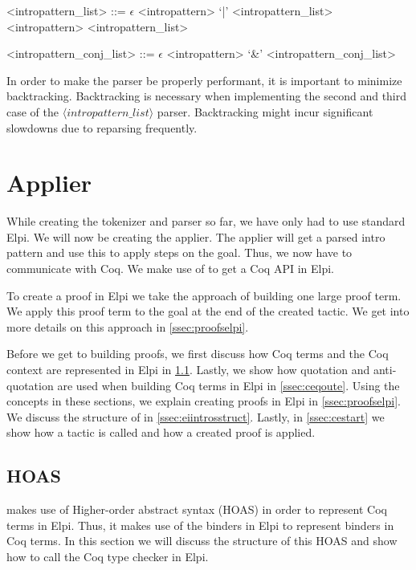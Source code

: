 \documentclass[thesis.tex]{subfiles}
\begin{document}
{{\begin{grammar}
    <intropattern\_list> ::= $\epsilon$
    \alt <intropattern> `|' <intropattern\_list>
    \alt <intropattern> <intropattern\_list>

    <intropattern\_conj\_list> ::= $\epsilon$
    \alt <intropattern> `&' <intropattern\_conj\_list>
\end{grammar}
In order to make the parser be properly performant, it is important to minimize backtracking. Backtracking is necessary when implementing the second and third case of the $\langle intropattern\_list\rangle$ parser. Backtracking might incur significant slowdowns due to reparsing frequently.

\section{Applier}\label{ssec:applier}
While creating the tokenizer and parser so far, we have only had to use standard Elpi. We will now be creating the applier. The applier will get a parsed intro pattern and use this to apply steps on the goal. Thus, we now have to communicate with Coq. We make use of \ce \cite{tassiElpiExtensionLanguage2018} to get a Coq API in Elpi.

To create a proof in Elpi we take the approach of building one large proof term. We apply this proof term to the goal at the end of the created tactic. We get into more details on this approach in \cref{ssec:proofselpi}.

Before we get to building proofs, we first discuss how Coq terms and the Coq context are represented in Elpi in \cref{ssec:cehoas}. Lastly, we show how quotation and anti-quotation are used when building Coq terms in Elpi in \cref{ssec:ceqoute}. Using the concepts in these sections, we explain creating proofs in Elpi in \cref{ssec:proofselpi}. We discuss the structure of  in \cref{ssec:eiintrosstruct}. Lastly, in \cref{ssec:cestart} we show how a tactic is called and how a created proof is applied.


\subsection{\ce HOAS} \label{ssec:cehoas}
\ce makes use of Higher-order abstract syntax (HOAS) \cite{pfenningHigherorderAbstractSyntax1988} in order to represent Coq terms in Elpi. Thus, it makes use of the binders in Elpi to represent binders in Coq terms. In this section we will discuss the structure of this HOAS and show how to call the Coq type checker in Elpi.

}}
\end{document}
